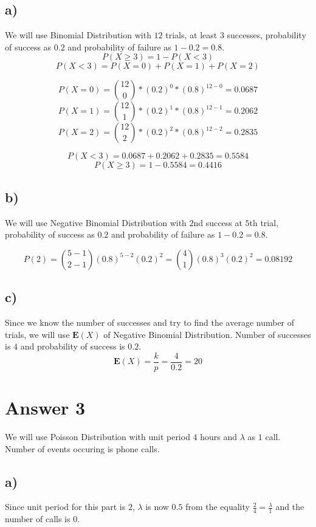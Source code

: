 \documentclass[12pt]{article}
\begin{document}
\subsection*{a)}
We will use Binomial Distribution with $12$ trials, at least $3$ successes, probability of success as $0.2$ and probability of failure as $1-0.2 = 0.8$.
$$P(X \geq 3) = 1  - P(X < 3)$$
$$P(X < 3) = P(X = 0) + P(X = 1) + P(X = 2)$$

$$P(X = 0) = \binom{12}{0}*(0.2)^{0}*(0.8)^{12-0} = 0.0687$$
$$P(X = 1) = \binom{12}{1}*(0.2)^{1}*(0.8)^{12-1} = 0.2062$$
$$P(X = 2) = \binom{12}{2}*(0.2)^{2}*(0.8)^{12-2} = 0.2835$$

$$P(X < 3) = 0.0687 + 0.2062 + 0.2835 = 0.5584$$
$$P(X \geq 3) = 1  - 0.5584 = 0.4416$$
\subsection*{b)}

We will use Negative Binomial Distribution with $2$nd success at $5$th trial, probability of success as $0.2$ and probability of failure as $1-0.2 = 0.8$.

$$P(2) = \binom{5-1}{2-1}(0.8)^{5-2}(0.2)^{2} = \binom{4}{1}(0.8)^{3}(0.2)^{2} = 0.08192$$

\subsection*{c)}

Since we know the number of successes and try to find the average number of trials, we will use $\textbf{E}(X)$ of Negative Binomial Distribution. Number of successes is $4$ and probability of success is $0.2$.
$$\textbf{E}(X) = \frac{k}{p} = \frac{4}{0.2} = 20$$

\newpage

\section*{Answer 3}

We will use Poisson Distribution with unit period $4$ hours and $\lambda$ as $1$ call. Number of events occuring is phone calls.

\vspace{1.5cm}

\subsection*{a)}

Since unit period for this part is $2$, $\lambda$ is now $0.5$ from the equality $\frac{2}{4} = \frac{\lambda}{1}$ and the number of calls is $0$.
\end{document}
